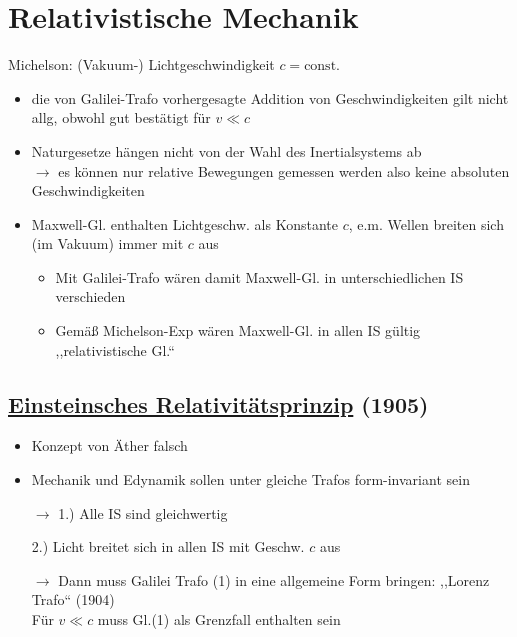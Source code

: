 \documentclass[titlepage,12pt,a4paper,ngerman]{report}
\newcommand{\tx}[1]{\textrm{#1}}
\newcommand{\const}{\tx{const.}}
\begin{document}
{%

\section{Relativistische Mechanik}
Michelson: (Vakuum-) Lichtgeschwindigkeit $ c = \const $
\begin{itemize}
	\item die von Galilei-Trafo vorhergesagte Addition von Geschwindigkeiten gilt nicht allg, obwohl gut bestätigt für $ v \ll c $
	\item Naturgesetze hängen nicht von der Wahl des Inertialsystems ab\\
	$ \rightarrow $ es können nur relative Bewegungen gemessen werden also keine absoluten Geschwindigkeiten
	\item Maxwell-Gl. enthalten Lichtgeschw. als Konstante $ c $, e.m. Wellen breiten sich (im Vakuum) immer mit $ c $ aus
	\begin{itemize}
		\item Mit Galilei-Trafo wären damit Maxwell-Gl. in unterschiedlichen IS verschieden
		\item Gemäß Michelson-Exp wären Maxwell-Gl. in allen IS gültig ,,relativistische Gl.``
	\end{itemize}
\end{itemize}
\subsection{\underline{Einsteinsches Relativitätsprinzip} (1905)}
\begin{itemize}
	\item Konzept von Äther falsch
	\item Mechanik und Edynamik sollen unter gleiche Trafos form-invariant sein
\end{itemize}
\begin{enumerate}
	\item[$ \rightarrow $ 1.)] Alle IS sind gleichwertig
	\item[2.)] Licht breitet sich in allen IS mit Geschw. $ c $ aus
\end{enumerate}
\begin{enumerate}
	\item[$ \rightarrow $ \phantom{1.)}] 	Dann muss Galilei Trafo (1) in eine allgemeine Form bringen: ,,Lorenz Trafo`` (1904)\\
	Für $ v \ll c $ muss Gl.(1) als Grenzfall enthalten sein
\end{enumerate}

}
\end{document}
